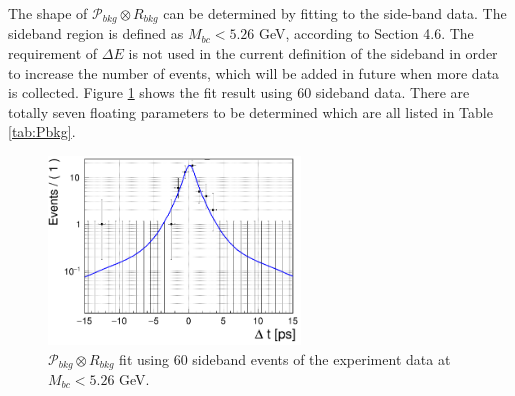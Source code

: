 The shape of $\mathcal{P}_{bkg}\otimes R_{bkg}$ can be determined by fitting to the side-band data. The sideband region is defined as $M_{bc}<5.26$ GeV, according to Section 4.6. The requirement of $\Delta E$ is not used in the current definition of the sideband in order to increase the number of events, which will be added in future when more data is collected. Figure \ref{fig:Pbkg} shows the fit result using 60 sideband data. There are totally seven floating parameters to be determined which are all listed in Table \ref{tab:Pbkg}.
\begin{figure}[htpb]
	\centering
	\includegraphics[height=5cm]{figures/bgres}
	\caption{$\mathcal{P}_{bkg}\otimes R_{bkg}$ fit  using 60 sideband events of the experiment data at $M_{bc} < 5.26$ GeV.}
	\label{fig:Pbkg}
\end{figure}

